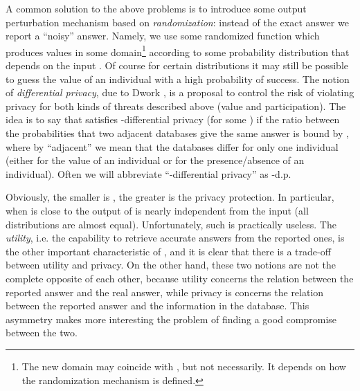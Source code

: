 \documentclass{llncs}
\begin{document}
A common solution to the above problems is to introduce some output perturbation mechanism based on \emph{randomization}: instead of the exact answer  we report a ``noisy'' answer. Namely, we use some  randomized function  which produces values in some domain\footnote{The new domain  may coincide with , but not necessarily. It depends on how the randomization mechanism is defined.}  
according to some probability distribution that depends on the input . Of course for certain distributions it may still be possible to guess the value of an individual with a high probability of success. 
The notion of \emph{differential privacy}, due to  Dwork \cite{Dwork:06:ICALP,Dwork:09:STOC,Dwork:10:SODA,Dwork:11:CACM}, is a proposal to control  the risk of violating privacy for both kinds of threats described above (value and participation).  
The idea is to say  that  satisfies -differential privacy  (for some ) if the ratio between the probabilities that two adjacent databases give the same answer is bound by , where by ``adjacent'' we mean that the  databases differ for only one individual 
(either for the value of an individual or for the presence/absence of an individual). Often we will abbreviate ``-differential privacy'' as -d.p.

Obviously, the smaller is ,  the greater is the privacy protection. In particular, when  is close to  the output of  is nearly independent from the input (all distributions are almost equal). Unfortunately, such  is practically useless. 
The \emph{utility}, i.e. the capability to retrieve accurate answers from the reported ones, is the other important characteristic of , and it is clear that there is a trade-off between utility and privacy. On the other hand, these two notions are not the complete opposite of each other, because utility concerns the relation between the reported answer and the real answer, while privacy is concerns the relation between the reported answer and the information in the database. This asymmetry makes more interesting the problem of finding a good compromise between the two. 
\end{document}
